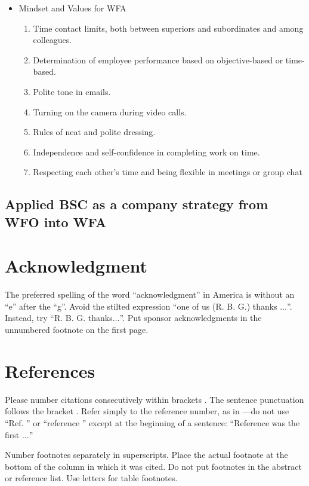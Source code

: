 \documentclass[conference]{IEEEtran}
\begin{document}
\begin{itemize}
\begin{enumerate}
\end{enumerate}
\item {Mindset and Values for WFA}
\begin{enumerate}
\item Time contact limits, both between superiors and subordinates and among colleagues.
\item Determination of employee performance based on objective-based or time-based.
\item Polite tone in emails.
\item Turning on the camera during video calls.
\item Rules of neat and polite dressing.
\item Independence and self-confidence in completing work on time.
\item Respecting each other's time and being flexible in meetings or group chat
\end{enumerate}
\end{itemize}

\subsection{Applied BSC as a company strategy from WFO into WFA}





\section*{Acknowledgment}

The preferred spelling of the word ``acknowledgment'' in America is without 
an ``e'' after the ``g''. Avoid the stilted expression ``one of us (R. B. 
G.) thanks $\ldots$''. Instead, try ``R. B. G. thanks$\ldots$''. Put sponsor 
acknowledgments in the unnumbered footnote on the first page.

\section*{References}

Please number citations consecutively within brackets \cite{b1}. The 
sentence punctuation follows the bracket \cite{b2}. Refer simply to the reference 
number, as in \cite{b3}---do not use ``Ref. \cite{b3}'' or ``reference \cite{b3}'' except at 
the beginning of a sentence: ``Reference \cite{b3} was the first $\ldots$''

Number footnotes separately in superscripts. Place the actual footnote at 
the bottom of the column in which it was cited. Do not put footnotes in the 
abstract or reference list. Use letters for table footnotes.
\end{document}

